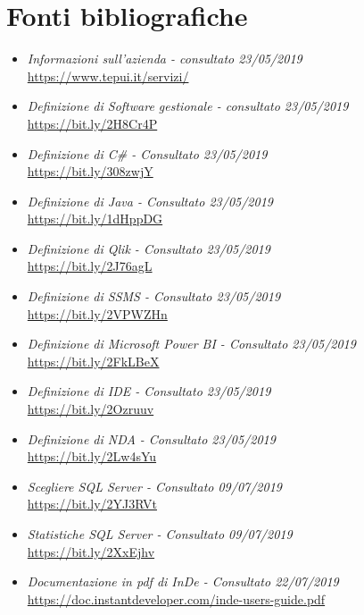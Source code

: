 

\cleardoublepage
\chapter{Fonti bibliografiche}

\begin{itemize}
	\item \textit{Informazioni sull'azienda - consultato 23/05/2019}\\
	\url{https://www.tepui.it/servizi/}
	
	\item \textit{Definizione di Software gestionale - consultato 23/05/2019}\\
	\url{https://bit.ly/2H8Cr4P}
	
	\item \textit{Definizione di C\# - Consultato 23/05/2019}\\
	\url{https://bit.ly/308zwjY}
	
	\item \textit{Definizione di Java - Consultato 23/05/2019}\\
	\url{https://bit.ly/1dHppDG} 
	
	\item \textit{Definizione di Qlik - Consultato 23/05/2019}\\
	\url{https://bit.ly/2J76agL} 
	
	\item \textit{Definizione di SSMS - Consultato 23/05/2019}\\
	\url{https://bit.ly/2VPWZHn} 
	
	\item \textit{Definizione di Microsoft Power BI - Consultato 23/05/2019}\\
	\url{https://bit.ly/2FkLBeX}
	
	\item \textit{Definizione di IDE - Consultato 23/05/2019}\\
	\url{https://bit.ly/2Ozruuv}
	
	\item \textit{Definizione di NDA - Consultato 23/05/2019}\\
	\url{https://bit.ly/2Lw4sYu}
	
	\item \textit{Scegliere SQL Server - Consultato 09/07/2019}\\
	\url{https://bit.ly/2YJ3RVt}
	
	\item \textit{Statistiche SQL Server - Consultato 09/07/2019}\\
	\url{https://bit.ly/2XxEjhv}
		
	\item \textit{Documentazione in pdf di InDe - Consultato 22/07/2019}\\
	\url{https://doc.instantdeveloper.com/inde-users-guide.pdf}
	
\end{itemize}





